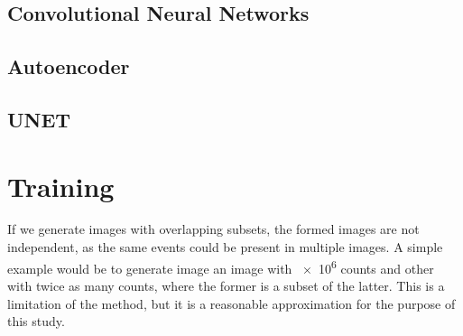




\subsection{Convolutional Neural Networks}
\subsection{Autoencoder}
\cite{goodfellowDeepLearning2016}
\subsection{UNET}



\section{Training}

If we generate images with overlapping subsets, the formed images are not independent, as the same events could be present in multiple images. A simple example would be to generate image an image with \num{e6} counts and other with twice as many counts, where the former is a subset of the latter. This is a limitation of the method, but it is a reasonable approximation for the purpose of this study.

